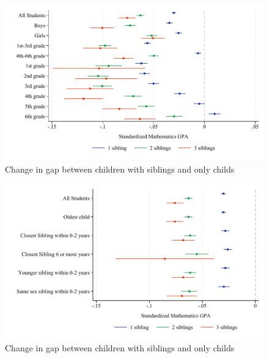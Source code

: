 \begin{figure}[htbp]
    \centering
    
        \includegraphics[width=\textwidth]{./FIGURES/TWFE/covid_twfe_B_bysibs_elm_all_gpa_m_adj_Tsiblings_Soldest_4.pdf}
        \caption{Change in gap between children with siblings and only childs}
        \label{fig:fig_appB}

\end{figure}

\begin{figure}[htbp]
    \centering
    
        \includegraphics[width=\textwidth]{./FIGURES/TWFE/covid_twfe_C_bysibs_elm_all_gpa_m_adj_Tsiblings_Soldest_4.pdf}
        \caption{Change in gap between children with siblings and only childs}
        \label{fig:fig_appC}

\end{figure}


